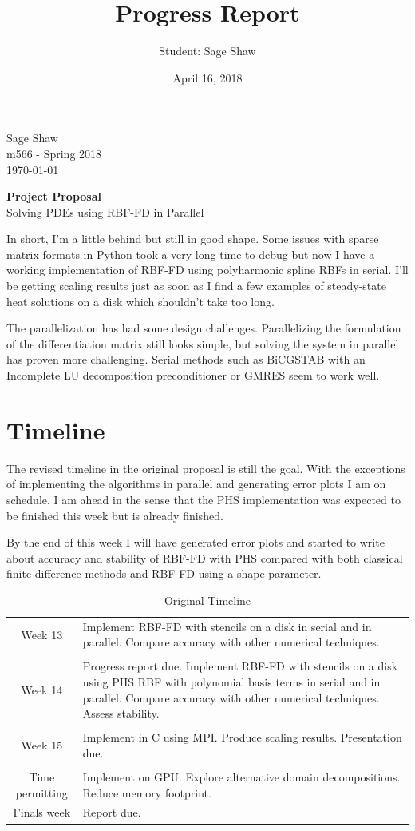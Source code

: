 \documentclass[12pt]{article}
\title{Progress Report}
\author{Student: Sage Shaw}
\date{April 16, 2018}
\begin{document}
	\thispagestyle{empty}
	
	\begin{flushright}
		Sage Shaw \\
		m566 - Spring 2018 \\
		\today
	\end{flushright}
	
	\begin{center}
		\Huge \textbf{Project Proposal} \\
		\large Solving PDEs using RBF-FD in Parallel
	\end{center}

In short, I'm a little behind but still in good shape. Some issues with sparse matrix formats in Python took a very long time to debug but now I have a working implementation of RBF-FD using polyharmonic spline RBFs in serial. I'll be getting scaling results just as soon as I find a few examples of steady-state heat solutions on a disk which shouldn't take too long.

The parallelization has had some design challenges. Parallelizing the formulation of the differentiation matrix still looks simple, but solving the system in parallel has proven more challenging. Serial methods such as BiCGSTAB with an Incomplete LU decomposition preconditioner or GMRES seem to work well.

\section{Timeline}
	The revised timeline in the original proposal is still the goal. With the exceptions of implementing the algorithms in parallel and generating error plots I am on schedule. I am ahead in the sense that the PHS implementation was expected to be finished this week but is already finished. 
	
	By the end of this week I will have generated error plots and started to write about accuracy and stability of RBF-FD with PHS compared with both classical finite difference methods and RBF-FD using a shape parameter. 
	
	\begin{table}[hb]
		\begin{tabular}{ c| p{12cm}} 
			Week 13 & Implement RBF-FD with stencils on a disk in serial and in parallel. Compare accuracy with other numerical techniques.\\
			& \\
			Week 14 & Progress report due. Implement RBF-FD with stencils on a disk using PHS RBF with polynomial basis terms in serial and in parallel. Compare accuracy with other numerical techniques. Assess stability. \\
			&\\
			Week 15 & Implement in C using MPI. Produce scaling results. Presentation due.\\
			&\\
			Time permitting & Implement on GPU. Explore alternative domain decompositions. Reduce memory footprint.\\
			Finals week & Report due.
		\end{tabular}
		\caption{Original Timeline}
	\end{table}
	
\end{document}
